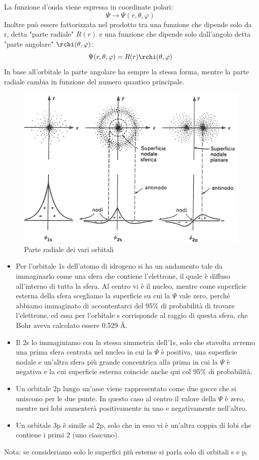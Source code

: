 La funzione d'onda viene espressa in coordinate polari:
$$\Psi \rightarrow \Psi(r, \theta, \varphi)$$
Inoltre può essere fattorizzata nel prodotto tra una funzione che dipende solo da r, detta "parte radiale" $R(r)$ e una funzione che dipende solo dall'angolo detta "parte angolare" $\rchi(\theta, \varphi)$:
$$\Psi(r, \theta, \varphi)=R(r) \rchi(\theta, \varphi)$$
In base all'orbitale la parte angolare ha sempre la stessa forma, mentre la parte radiale cambia in funzione del numero quantico principale.
\begin{figure}[htp]
  \centering
  \includegraphics[width=15cm]{immagini/psi.png}
  \caption*{Parte radiale dei vari orbitali}
\end{figure}


\begin{itemize}
  \item Per l'orbitale 1s dell'atomo di idrogeno si ha un andamento tale da immaginarlo come una sfera che contiene l'elettrone, il quale è diffuso all'interno di tutta la sfera. Al centro vi è il nucleo, mentre come superficie esterna della sfera scegliamo la superficie su cui la $\Psi$ vale zero, perché abbiamo immaginato di accontentarci del 95\% di probabilità di trovare l'elettrone, ed essa per l'orbitale s corrisponde al raggio di questa sfera, che Bohr aveva calcolato essere 0.529 Å.
  \item Il 2s lo immaginiamo con la stessa simmetria dell'1s, solo che stavolta avremo una prima sfera centrata nel nucleo in cui la $\Psi$ è positiva, una superficie nodale e un'altra sfera più grande concentrica alla prima in cui la $\Psi$ è negativa e la cui superficie esterna coincide anche qui col 95\% di probabilità.
  \item Un orbitale 2p lungo un'asse viene rappresentato come due gocce che si uniscono per le due punte. In questo caso al centro il valore della $\Psi$ è zero, mentre nei lobi aumenterà positivamente in uno e negativamente nell'altro.
  \item Un orbitale 3p è simile al 2p, solo che in esso vi è un'altra coppia di lobi che contiene i primi 2 (uno ciascuno).
\end{itemize}
Nota: se consideriamo solo le superfici più esterne si parla solo di orbitali s e p.

